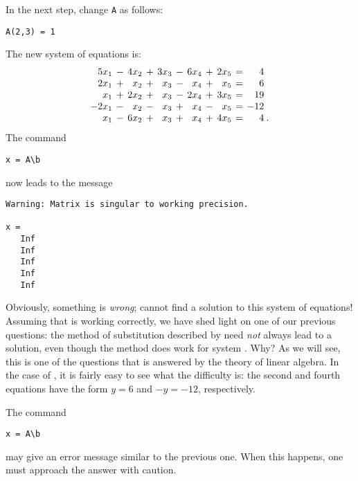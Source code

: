 In the next step, change {\tt A} as follows:
\begin{verbatim}
A(2,3) = 1
\end{verbatim}
The new system of equations is:
\begin{equation}  \label{incon}
\arraycolsep 2pt
\begin{array}{rcrcrcrcrcrl}
 5x_1 & - & 4x_2 & + & 3x_3 & - &  6x_4 & + & 2x_5 & = &   4  & \\
 2x_1 & + &  x_2 & + &  x_3 & - &   x_4 & + &  x_5 & = &   6  & \\
  x_1 & + & 2x_2 & + &  x_3 & - &  2x_4 & + & 3x_5 & = &  19  & \\
-2x_1 & - &  x_2 & - &  x_3 & + &   x_4 & - &  x_5 & = & -12  & \\
  x_1 & - & 6x_2 & + &  x_3 & + &   x_4 & + & 4x_5 & = &   4  & \!
.
\end{array}
\end{equation}
The command
\begin{verbatim}
x = A\b
\end{verbatim}  \index{\computer!$\backslash$}
now leads to the message
\begin{verbatim}
Warning: Matrix is singular to working precision.

x =
   Inf
   Inf
   Inf
   Inf
   Inf
\end{verbatim}  
Obviously, something is {\em wrong\/}; \Matlab cannot find a
solution to this system of equations!  Assuming that \Matlab is
working correctly, we have shed light on one of our previous
questions: the method of substitution described by  need
{\em not\/} always lead to a solution, even though the method
does work for system .  Why?  As we will see, this is
one of the questions that is answered by the theory of linear
algebra.  In the case of , it is fairly easy to see
what the difficulty is: the second and fourth equations
have the form $y=6$ and $-y=-12$, respectively.

\vspace{0.1in}

  The \Matlab command
\begin{verbatim}
x = A\b
\end{verbatim}
may give an error message similar to the previous one.  When
this happens, one must approach the answer with caution.

\EXER


\TEXER

